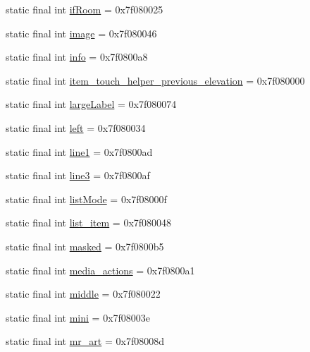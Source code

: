 \begin{CompactItemize}
static final int \hyperlink{classcom_1_1companyname_1_1x__2doo_1_1_r_1_1id_eca1513ce4e21feb299b7b39a2489ddf}{ifRoom} = 0x7f080025
\item 
static final int \hyperlink{classcom_1_1companyname_1_1x__2doo_1_1_r_1_1id_232fcbbba62ba657a3fa8b8ad5299d3c}{image} = 0x7f080046
\item 
static final int \hyperlink{classcom_1_1companyname_1_1x__2doo_1_1_r_1_1id_0f739968443003398137b3daed57d81d}{info} = 0x7f0800a8
\item 
static final int \hyperlink{classcom_1_1companyname_1_1x__2doo_1_1_r_1_1id_577722f0a87e2485bfe0f42214d6516a}{item\_\-touch\_\-helper\_\-previous\_\-elevation} = 0x7f080000
\item 
static final int \hyperlink{classcom_1_1companyname_1_1x__2doo_1_1_r_1_1id_7757b73c6978a3370a338bb609321a4f}{largeLabel} = 0x7f080074
\item 
static final int \hyperlink{classcom_1_1companyname_1_1x__2doo_1_1_r_1_1id_e74c5a7f6077cf18e1eec40c1b0e27fd}{left} = 0x7f080034
\item 
static final int \hyperlink{classcom_1_1companyname_1_1x__2doo_1_1_r_1_1id_0adf0d3e15c546a64c4a886fc14edc58}{line1} = 0x7f0800ad
\item 
static final int \hyperlink{classcom_1_1companyname_1_1x__2doo_1_1_r_1_1id_aa1a7bf14a8fcbd5eba36b4589d307c8}{line3} = 0x7f0800af
\item 
static final int \hyperlink{classcom_1_1companyname_1_1x__2doo_1_1_r_1_1id_ab2d0b363071cd9759b5d3031ca3720e}{listMode} = 0x7f08000f
\item 
static final int \hyperlink{classcom_1_1companyname_1_1x__2doo_1_1_r_1_1id_15812ce5961d72596f771807776c0bbc}{list\_\-item} = 0x7f080048
\item 
static final int \hyperlink{classcom_1_1companyname_1_1x__2doo_1_1_r_1_1id_8f456777011b2d3cca2b0058b4e2ad7a}{masked} = 0x7f0800b5
\item 
static final int \hyperlink{classcom_1_1companyname_1_1x__2doo_1_1_r_1_1id_18a0ba4506826a32884e52a099afe81a}{media\_\-actions} = 0x7f0800a1
\item 
static final int \hyperlink{classcom_1_1companyname_1_1x__2doo_1_1_r_1_1id_c7c9e2f9ec1f9ea39d08e37bd7170e7e}{middle} = 0x7f080022
\item 
static final int \hyperlink{classcom_1_1companyname_1_1x__2doo_1_1_r_1_1id_f68d3c0f3e840a4bc33333154e74abb9}{mini} = 0x7f08003e
\item 
static final int \hyperlink{classcom_1_1companyname_1_1x__2doo_1_1_r_1_1id_1ebd44e74fb83da5c53ee87098ed0a78}{mr\_\-art} = 0x7f08008d

\end{CompactItemize}

